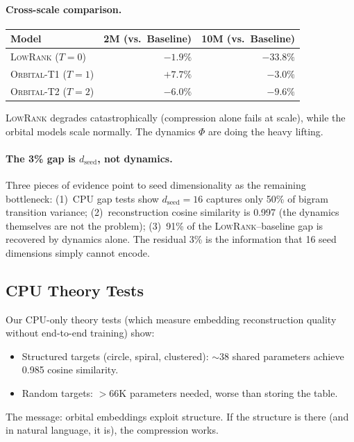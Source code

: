 \documentclass[11pt, a4paper]{article}
\theoremstyle{remark}
\begin{document}
\paragraph{Cross-scale comparison.}

\begin{center}\small
\begin{tabular}{@{}lrr@{}}
\toprule
\textbf{Model} & \textbf{2M (vs.\ Baseline)} & \textbf{10M (vs.\ Baseline)} \\
\midrule
\textsc{LowRank} ($T{=}0$) & $-1.9\%$ & $-33.8\%$ \\
\textsc{Orbital-T1} ($T{=}1$) & $+7.7\%$ & $-3.0\%$ \\
\textsc{Orbital-T2} ($T{=}2$) & $-6.0\%$ & $-9.6\%$ \\
\bottomrule
\end{tabular}
\end{center}

\noindent \textsc{LowRank} degrades catastrophically (compression alone fails at scale), while the orbital models scale normally.
The dynamics $\Phi$ are doing the heavy lifting.

\paragraph{The 3\% gap is $d_{\text{seed}}$, not dynamics.}
Three pieces of evidence point to seed dimensionality as the remaining bottleneck:
(1)~CPU gap tests show $d_{\text{seed}} = 16$ captures only 50\% of bigram transition variance;
(2)~reconstruction cosine similarity is 0.997 (the dynamics themselves are not the problem);
(3)~91\% of the \textsc{LowRank}--baseline gap is recovered by dynamics alone.
The residual 3\% is the information that 16 seed dimensions simply cannot encode.

\subsection{CPU Theory Tests}

Our CPU-only theory tests (which measure embedding reconstruction quality without end-to-end training) show:
\begin{itemize}[nosep]
    \item Structured targets (circle, spiral, clustered): $\sim$38 shared parameters achieve 0.985 cosine similarity.
    \item Random targets: $>$66K parameters needed, worse than storing the table.
\end{itemize}
The message: orbital embeddings exploit structure.
If the structure is there (and in natural language, it is), the compression works.
\end{document}
